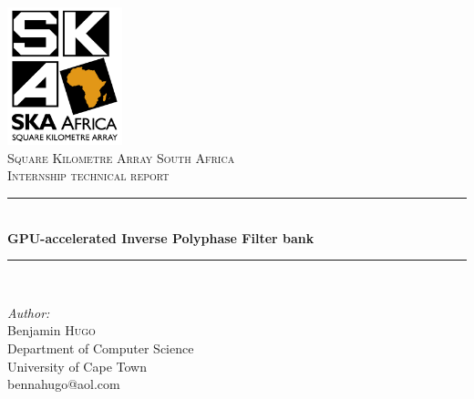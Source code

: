 \documentclass[a4paper,10pt]{article}
\begin{document}
\begin{titlepage}

\newcommand{\HRule}{\rule{\linewidth}{0.5mm}} %

\center %
 

\includegraphics[width=0.25\textwidth]{ska_logo_rgb.jpg}\\[1cm] %

 

\textsc{\LARGE Square Kilometre Array South Africa}\\[1.5cm]
\textsc{\Large Internship technical report}\\[0.5cm]


\HRule \\[0.4cm]
{ \huge \bfseries GPU-accelerated Inverse Polyphase Filter bank}\\[0.4cm]
\HRule \\[1.5cm]
 

\begin{minipage}{0.4\textwidth}
\begin{flushleft} \large
\emph{Author:}\\
Benjamin \textsc{Hugo}\\[0.2cm] %
\small{Department of Computer Science}\\
\small{University of Cape Town}\\
\small{bennahugo@aol.com}


\end{flushleft}
\end{minipage}
\end{titlepage}
\end{document}
